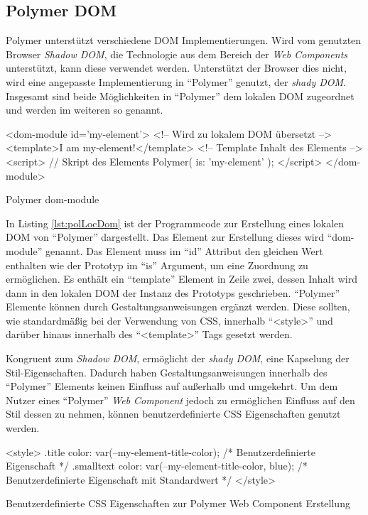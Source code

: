 \documentclass[12pt, paper=a4, bibtotoc, toc=listof, headsepline=true, numbers=endperiod]{scrreprt}
\begin{document}
\subsection{Polymer DOM}
Polymer unterstützt verschiedene \ac{DOM} Implementierungen. Wird vom genutzten Browser \emph{Shadow DOM}, die Technologie aus dem Bereich der \emph{Web Components} unterstützt, kann diese verwendet werden. Unterstützt der Browser dies nicht, wird eine angepasste Implementierung in \enquote{Polymer} genutzt, der \emph{shady DOM}. Insgesamt sind beide Möglichkeiten in \enquote{Polymer} dem lokalen \ac{DOM} zugeordnet und werden im weiteren so genannt\cite{polLocDom}.
\begin{listing}
	\begin{HTMLcode*}{}
<dom-module id='my-element'> <!-- Wird zu lokalem DOM übersetzt -->
   <template>I am my-element!</template>  <!-- Template Inhalt des Elements -->
   <script>  // Skript des Elements
      Polymer({
      is: 'my-element'
      });
   </script>
</dom-module>
	\end{HTMLcode*}
	\caption{Polymer dom-module}
	\label{lst:polLocDom}
\end{listing}
In Listing \ref{lst:polLocDom} ist der Programmcode zur Erstellung eines lokalen \ac{DOM} von \enquote{Polymer} dargestellt. Das Element zur Erstellung dieses wird \enquote{dom-module} genannt. Das Element muss im \enquote{id} Attribut den gleichen Wert enthalten wie der Prototyp im \enquote{is} Argument, um eine Zuordnung zu ermöglichen. Es enthält ein \enquote{template} Element in Zeile zwei, dessen Inhalt wird dann in den lokalen \ac{DOM} der Instanz des Prototyps geschrieben. \newline
\enquote{Polymer} Elemente können durch Gestaltungsanweisungen ergänzt werden. Diese sollten, wie standardmäßig bei der Verwendung von \ac{CSS}, innerhalb \enquote{<style>} und darüber hinaus innerhalb des \enquote{<template>} Tags gesetzt werden.

\newline
Kongruent zum \emph{Shadow DOM}, ermöglicht der \emph{shady DOM}, eine Kapselung der Stil-Eigenschaften. Dadurch haben Gestaltungsanweisungen innerhalb des \enquote{Polymer} Elements keinen Einfluss auf außerhalb und umgekehrt. Um dem Nutzer eines \enquote{Polymer} \emph{Web Component} jedoch zu ermöglichen Einfluss auf den Stil dessen zu nehmen, können benutzerdefinierte \ac{CSS} Eigenschaften genutzt werden\cite{polStyLocDom}.
\begin{listing}
	\begin{HTMLcode*}{}
<style>
.title {
	color: var(--my-element-title-color); /* Benutzerdefinierte Eigenschaft */
}
.smalltext {
	color: var(--my-element-title-color, blue); /* Benutzerdefinierte Eigenschaft mit Standardwert */
}
</style>
	\end{HTMLcode*}
	\caption[Benutzerdefinierte CSS Eigenschaften]{Benutzerdefinierte CSS Eigenschaften zur Polymer Web Component Erstellung}
	\label{lst:benCss}
\end{listing}
\end{document}
